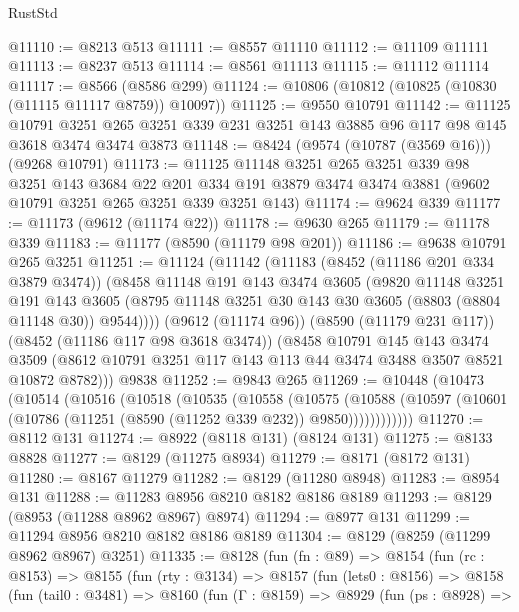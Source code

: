 \begin{lexlean}{RustStd}
\begin{coremodule}
@11110 := @8213 @513
@11111 := @8557 @11110
@11112 := @11109 @11111
@11113 := @8237 @513
@11114 := @8561 @11113
@11115 := @11112 @11114
@11117 := @8566 (@8586 @299)
@11124 := @10806 (@10812 (@10825 (@10830 (@11115 @11117 @8759)) @10097))
@11125 := @9550 @10791
@11142 := @11125
    @10791
    @3251
    @265
    @3251
    @339
    @231
    @3251
    @143
    @3885
    @96
    @117
    @98
    @145
    @3618
    @3474
    @3474
    @3873
@11148 := @8424 (@9574 (@10787 (@3569 @16))) (@9268 @10791)
@11173 := @11125
    @11148
    @3251
    @265
    @3251
    @339
    @98
    @3251
    @143
    @3684
    @22
    @201
    @334
    @191
    @3879
    @3474
    @3474
    @3881
    (@9602 @10791 @3251 @265 @3251 @339 @3251 @143)
@11174 := @9624 @339
@11177 := @11173 (@9612 (@11174 @22))
@11178 := @9630 @265
@11179 := @11178 @339
@11183 := @11177 (@8590 (@11179 @98 @201))
@11186 := @9638 @10791 @265 @3251
@11251 := @11124
    (@11142
      (@11183
        (@8452 (@11186 @201 @334 @3879 @3474))
        (@8458
          @11148
          @191
          @143
          @3474
          @3605
          (@9820
            @11148
            @3251
            @191
            @143
            @3605
            (@8795 @11148 @3251 @30 @143 @30 @3605 (@8803 (@8804 @11148 @30)) @9544))))
      (@9612 (@11174 @96))
      (@8590 (@11179 @231 @117))
      (@8452 (@11186 @117 @98 @3618 @3474))
      (@8458
        @10791
        @145
        @143
        @3474
        @3509
        (@8612 @10791 @3251 @117 @143 @113 @44 @3474 @3488 @3507 @8521 @10872 @8782)))
    @9838
@11252 := @9843 @265
@11269 := @10448
    (@10473
      (@10514
        (@10516
          (@10518
            (@10535
              (@10558
                (@10575
                  (@10588
                    (@10597 (@10601 (@10786 (@11251 (@8590 (@11252 @339 @232)) @9850))))))))))))
@11270 := @8112 @131
@11274 := @8922 (@8118 @131) (@8124 @131)
@11275 := @8133 @8828
@11277 := @8129 (@11275 @8934)
@11279 := @8171 (@8172 @131)
@11280 := @8167 @11279
@11282 := @8129 (@11280 @8948)
@11283 := @8954 @131
@11288 := @11283 @8956 @8210 @8182 @8186 @8189
@11293 := @8129 (@8953 (@11288 @8962 @8967) @8974)
@11294 := @8977 @131
@11299 := @11294 @8956 @8210 @8182 @8186 @8189
@11304 := @8129 (@8259 (@11299 @8962 @8967) @3251)
@11335 := @8128
    (fun (fn : @89) =>
    @8154
      (fun (rc : @8153) =>
      @8155
        (fun (rty : @3134) =>
        @8157
          (fun (lets0 : @8156) =>
          @8158
            (fun (tail0 : @3481) =>
            @8160
              (fun (Γ : @8159) =>
              @8929
                (fun (ps : @8928) =>

\end{coremodule}
\end{lexlean}
